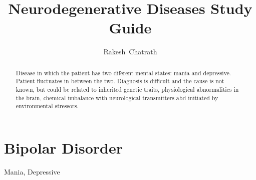 \documentclass[journal]{IEEEtran}
\begin{document}
\title{Neurodegenerative Diseases Study Guide}
\author{Rakesh~Chatrath}
\maketitle
\section{Bipolar Disorder}
\begin{abstract}
Disease in which the patient has two diferent mental states: mania and depressive. Patient fluctuates in between the two. Diagnosis is difficult and the cause is not known, but could be related to inherited genetic traits, physiological abnormalities in the brain, chemical imbalance with neurological transmitters abd initiated by environmental stressors.
\end{abstract}
\begin{IEEEkeywords}
Mania, Depressive
\end{IEEEkeywords}
\end{document}

